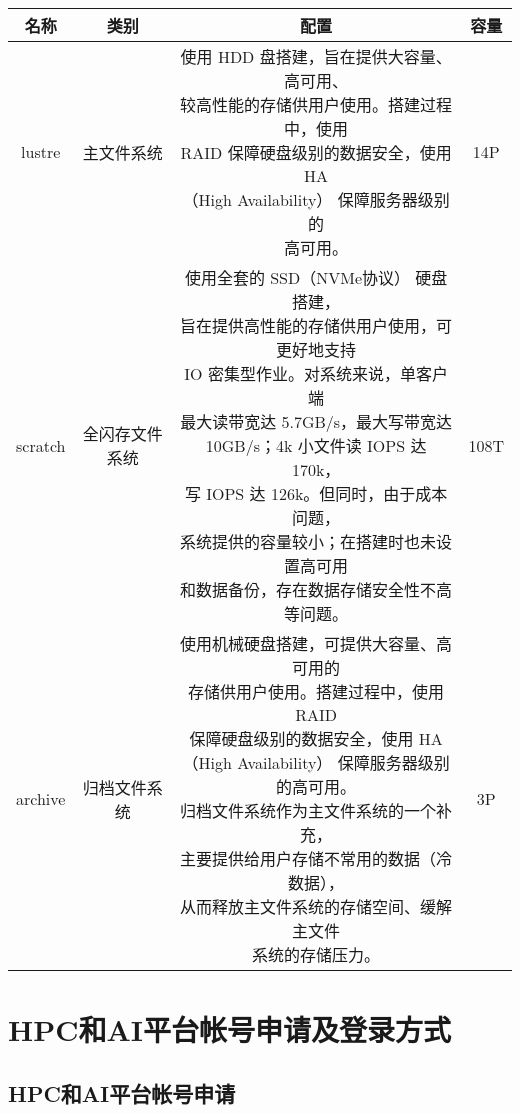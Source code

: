 \documentclass[cn, 12pt, hang, black, chinese]{elegantbook}
\begin{document}
\begin{table2}
\begin{tabular}{ |c|c|c|c| }
 \hline
 名称 & 类别 & 配置 & 容量 \\
 \hline \hline
 lustre & 主文件系统 & \makecell[l]{使用 HDD 盘搭建，旨在提供大容量、高可用、\\较高性能的存储供用户使用。搭建过程中，使用\\ RAID 保障硬盘级别的数据安全，使用 HA\\（High Availability） 保障服务器级别的\\高可用。} & 14P\\
 \hline
 scratch & 全闪存文件系统 & \makecell[l]{使用全套的 SSD（NVMe协议） 硬盘搭建，\\旨在提供高性能的存储供用户使用，可更好地支持\\ IO 密集型作业。对系统来说，单客户端\\最大读带宽达 5.7GB/s，最大写带宽达\\ 10GB/s；4k 小文件读 IOPS 达 170k，\\写 IOPS 达 126k。但同时，由于成本问题，\\系统提供的容量较小；在搭建时也未设置高可用\\和数据备份，存在数据存储安全性不高等问题。} & 108T\\
 \hline
 archive & 归档文件系统 & \makecell[l]{使用机械硬盘搭建，可提供大容量、高可用的\\存储供用户使用。搭建过程中，使用 RAID \\保障硬盘级别的数据安全，使用 HA\\（High Availability） 保障服务器级别的高可用。\\归档文件系统作为主文件系统的一个补充，\\主要提供给用户存储不常用的数据（冷数据），\\从而释放主文件系统的存储空间、缓解主文件\\系统的存储压力。} & 3P\\
 \hline
\end{tabular}
\end{table2}

\chapter{HPC和AI平台帐号申请及登录方式}

\section{HPC和AI平台帐号申请}
\end{document}
